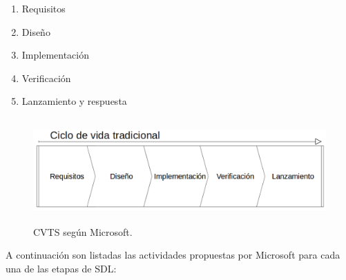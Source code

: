 \documentclass[runningheads,a4paper]{llncs}
\begin{document}
\begin{enumerate}
	\item Requisitos
	\item Diseño
	\item Implementación
	\item Verificación
	\item Lanzamiento y respuesta
\end{enumerate}

\begin{figure}
\centering
\includegraphics[height=4.0cm, width=12.0cm]{sa_figura_1}
\caption{\gls{CVTS} según Microsoft.}
\label{fig:example}
\end{figure}

A continuación son listadas las actividades propuestas por Microsoft para cada una de las etapas de \gls{SDL}:
\end{document}
